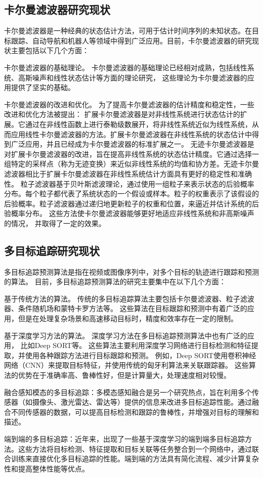 \subsection{卡尔曼滤波器研究现状}
卡尔曼滤波器是一种经典的状态估计方法，可用于估计时间序列的未知状态。在目标跟踪、自动导航和机器人等领域中得到广泛应用。目前，卡尔曼滤波器的研究现状主要包括以下几个方面：
\par
卡尔曼滤波器的基础理论。
卡尔曼滤波器的基础理论已经相对成熟，包括线性系统、高斯噪声和线性状态估计等方面的理论研究，
这些理论为卡尔曼滤波器的应用提供了坚实的基础。
\par
卡尔曼滤波器的改进和优化。
为了提高卡尔曼滤波器的估计精度和稳定性，一些改进和优化方法被提出：
扩展卡尔曼滤波器\cite{ribeiro2004kalman}是对非线性系统进行状态估计的扩展。它通过在非线性函数上进行泰勒级数展开，将非线性系统近似为线性系统，从而应用线性卡尔曼滤波器的方法。扩展卡尔曼滤波器在非线性系统的状态估计中得到广泛应用，并且已经成为卡尔曼滤波器的标准扩展之一。
无迹卡尔曼滤波器\cite{wan2000unscented}是对扩展卡尔曼滤波器的改进，旨在提高非线性系统的状态估计精度。它通过选择一组特定的采样点（称为无迹变换）来近似非线性系统的均值和协方差。无迹卡尔曼滤波器相比于扩展卡尔曼滤波器在非线性系统估计方面具有更好的稳定性和准确性。
粒子滤波器\cite{gustafsson2010particle}基于贝叶斯滤波理论，通过使用一组粒子来表示状态的后验概率分布。每个粒子都代表了系统状态的一个假设或样本。粒子的权重表示了该假设的后验概率。粒子滤波器通过递归地更新粒子的权重和位置，来逼近并估计系统的后验概率分布。
这些方法使卡尔曼滤波器能够更好地适应非线性系统和非高斯噪声的情况，
并取得了一定的效果。

\subsection{多目标追踪研究现状}
多目标追踪预测算法是指在视频或图像序列中，对多个目标的轨迹进行跟踪和预测的算法。
目前，多目标追踪预测算法的研究主要集中在以下几个方面：
\par
基于传统方法的算法。
传统的多目标追踪算法主要包括卡尔曼滤波器、粒子滤波器、条件随机场和蒙特卡罗方法等。
这些算法在目标跟踪和预测中有着广泛的应用，但是在处理复杂场景和高速移动目标时，精度和效率存在一定的限制。
\par
基于深度学习方法的算法。
深度学习方法在多目标追踪预测算法中也有广泛的应用\cite{xu2019deep}，
比如Deep SORT\cite{wojke2017simple}等。
这些算法主要利用深度学习网络进行目标检测和特征提取，并使用各种跟踪方法进行目标跟踪和预测。
例如，Deep SORT使用卷积神经网络（CNN）来提取目标特征，并使用传统的匈牙利算法来关联跟踪器。
这些算法的优势在于准确率高、鲁棒性好，但是计算量大，处理速度相对较慢。
\par
融合感知模态的多目标追踪：多模态感知融合是另一个研究热点，旨在利用多个传感器（如摄像头、激光雷达、雷达等）提供的信息来改进多目标追踪性能。通过融合不同传感器的数据，可以提高目标检测和跟踪的鲁棒性，并增强对目标的理解和描述。
\par
端到端的多目标追踪：近年来，出现了一些基于深度学习的端到端多目标追踪方法。这些方法将目标检测、特征提取和目标关联等任务整合到一个网络中，通过联合训练来直接优化多目标追踪的性能。端到端的方法具有简化流程、减少计算复杂性和提高整体性能等优点。


